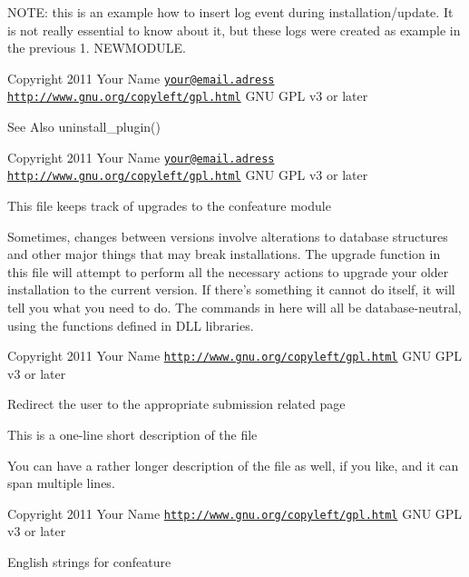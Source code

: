 N\-O\-T\-E\-: this is an example how to insert log event during installation/update. It is not really essential to know about it, but these logs were created as example in the previous 1. N\-E\-W\-M\-O\-D\-U\-L\-E.

\begin{DoxyCopyright}{Copyright}
2011 Your Name \href{mailto:your@email.adress}{\tt your@email.\-adress}  \href{http://www.gnu.org/copyleft/gpl.html}{\tt http\-://www.\-gnu.\-org/copyleft/gpl.\-html} G\-N\-U G\-P\-L v3 or later
\end{DoxyCopyright}
\begin{DoxySeeAlso}{See Also}
uninstall\-\_\-plugin()
\end{DoxySeeAlso}
\begin{DoxyCopyright}{Copyright}
2011 Your Name \href{mailto:your@email.adress}{\tt your@email.\-adress}  \href{http://www.gnu.org/copyleft/gpl.html}{\tt http\-://www.\-gnu.\-org/copyleft/gpl.\-html} G\-N\-U G\-P\-L v3 or later
\end{DoxyCopyright}
This file keeps track of upgrades to the confeature module

Sometimes, changes between versions involve alterations to database structures and other major things that may break installations. The upgrade function in this file will attempt to perform all the necessary actions to upgrade your older installation to the current version. If there's something it cannot do itself, it will tell you what you need to do. The commands in here will all be database-\/neutral, using the functions defined in D\-L\-L libraries.

\begin{DoxyCopyright}{Copyright}
2011 Your Name  \href{http://www.gnu.org/copyleft/gpl.html}{\tt http\-://www.\-gnu.\-org/copyleft/gpl.\-html} G\-N\-U G\-P\-L v3 or later
\end{DoxyCopyright}
Redirect the user to the appropriate submission related page

This is a one-\/line short description of the file

You can have a rather longer description of the file as well, if you like, and it can span multiple lines.

\begin{DoxyCopyright}{Copyright}
2011 Your Name  \href{http://www.gnu.org/copyleft/gpl.html}{\tt http\-://www.\-gnu.\-org/copyleft/gpl.\-html} G\-N\-U G\-P\-L v3 or later
\end{DoxyCopyright}
English strings for confeature

